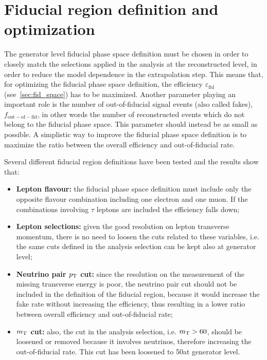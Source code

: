 \chapter{Fiducial region definition and optimization}
\label{app:fiducial_region}
\thispagestyle{empty}

The generator level fiducial phase space definition must be chosen in order to closely match the selections applied in the analysis at the reconstructed level, in order to reduce the model dependence in the extrapolation step. This means that, for optimizing the fiducial phase space definition, the efficiency $\varepsilon_\mathrm{fid}$ (see~\ref{sec:fid_space}) has to be maximized. Another parameter playing an important role is the number of out-of-fiducial signal events (also called fakes), $f_\mathrm{out-of-fid}$, in other words the number of reconstructed events which do not belong to the fiducial phase space. This parameter should instead be as small as possible. A simplistic way to improve the fiducial phase space definition is to maximize the ratio between the overall efficiency and out-of-fiducial rate.

Several different fiducial region definitions have been tested and the results show that:
\begin{itemize}
\item {\bf Lepton flavour:} the fiducial phase space definition must include only the opposite flavour combination including one electron and one muon. If the combinations involving $\tau$ leptons are included the efficiency falls down;
\item {\bf Lepton selections:} given the good resolution on lepton transverse momentum, there is no need to loosen the cuts related to these variables, i.e. the same cuts defined in the analysis selection can be kept also at generator level;
\item {\bf Neutrino pair \boldmath$p_\mathrm{T}$ cut:} since the resolution on the measurement of the missing transverse energy is poor, the neutrino pair cut should not be included in the definition of the fiducial region, because it would increase the fake rate without increasing the efficiency, thus resulting in a lower ratio between overall efficiency and out-of-fiducial rate;
\item {\bf \boldmath$m_\mathrm{T}$ cut:} also, the \mt cut in the analysis selection, i.e. $m_\mathrm{T}>60$\GeV, should be loosened or removed because it involves neutrinos, therefore increasing the out-of-fiducial rate. This cut has been loosened to 50\GeV at generator level.
\end{itemize}

